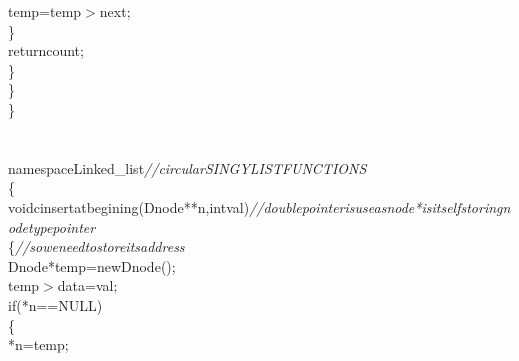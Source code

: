 \documentclass[a4paper, 9pt]{article}
\newcommand\SPC{\hspace*{0.6em}}
\newcommand\TAB{\hspace*{1.2em}}
\newcommand\HYP{\mbox{\char 45}}
\newcommand{\CppAComment}[1]{\textit{\textcolor[rgb]{0.4,0.45,0.48}{#1}}}
\newcommand{\CppAIdentifier}[1]{\textcolor[rgb]{0.88,0.89,0.89}{#1}}
\newcommand{\CppAReservedWord}[1]{\textcolor[rgb]{0.4,0.55,0.69}{#1}}
\newcommand{\CppASpace}[1]{\colorbox[rgb]{0.16,0.19,0.2}{#1}}
\newcommand{\CppASymbol}[1]{\textcolor[rgb]{0.91,0.89,0.72}{#1}}
\begin{document}
\begin{ttfamily}
\CppASpace{\TAB \TAB \TAB \TAB }\CppAIdentifier{temp}\CppASpace{\SPC }\CppASymbol{=}\CppASpace{\SPC }\CppAIdentifier{temp}\CppASymbol{\HYP $>$}\CppAIdentifier{next}\CppASymbol{;}\\
\CppASpace{\TAB \TAB \TAB }\CppASymbol{\}}\\
\CppASpace{\TAB \TAB }\CppAReservedWord{return}\CppASpace{\SPC }\CppAIdentifier{count}\CppASymbol{;}\\
\CppASpace{\TAB \TAB }\CppASymbol{\}}\\
\CppASpace{\TAB }\CppASymbol{\}}\\
\CppASymbol{\}}\\
\\
\\
\CppAReservedWord{namespace}\CppASpace{\SPC }\CppAIdentifier{Linked\_list}\CppASpace{\SPC \SPC }\CppAComment{//circularSINGYLISTFUNCTIONS}\\
\CppASymbol{\{}\\
\CppASpace{\TAB }\CppAReservedWord{void}\CppASpace{\SPC \SPC }\CppAIdentifier{cinsertatbegining}\CppASymbol{(}\CppASpace{\SPC }\CppAIdentifier{Dnode}\CppASymbol{*}\CppASymbol{*}\CppASpace{\SPC }\CppAIdentifier{n}\CppASymbol{,}\CppAReservedWord{int}\CppASpace{\SPC }\CppAIdentifier{val}\CppASymbol{)}\CppAComment{//double\SPC pointer\SPC is\SPC use\SPC as\SPC node\SPC *\SPC is\SPC itself\SPC storing\SPC node\SPC type\SPC pointer\SPC }\\
\CppASpace{\TAB }\CppASymbol{\{}\CppASpace{\SPC \SPC \SPC \SPC \SPC \SPC \SPC \SPC \SPC \SPC \SPC \SPC \SPC \SPC \SPC \SPC \SPC \SPC \SPC \SPC \SPC \SPC \SPC \SPC \SPC \SPC \SPC \SPC }\CppAComment{//\SPC so\SPC we\SPC need\SPC to\SPC store\SPC its\SPC address}\\
\CppASpace{\TAB \TAB }\CppAIdentifier{Dnode}\CppASymbol{*}\CppASpace{\SPC }\CppAIdentifier{temp}\CppASpace{\SPC }\CppASymbol{=}\CppAReservedWord{new}\CppASpace{\SPC }\CppAIdentifier{Dnode}\CppASymbol{(}\CppASymbol{)}\CppASymbol{;}\\
\CppASpace{\TAB \SPC \SPC \SPC \SPC \SPC }\CppAIdentifier{temp}\CppASymbol{\HYP $>$}\CppAIdentifier{data}\CppASymbol{=}\CppAIdentifier{val}\CppASymbol{;}\\
\CppASpace{\TAB \SPC \SPC \SPC \SPC }\CppAReservedWord{if}\CppASymbol{(}\CppASymbol{*}\CppAIdentifier{n}\CppASymbol{==}\CppAIdentifier{NULL}\CppASymbol{)}\\
\CppASpace{\TAB \SPC \SPC \SPC \SPC \TAB }\CppASymbol{\{}\CppASpace{\SPC }\\
\CppASpace{\TAB \TAB \TAB }\CppASymbol{*}\CppAIdentifier{n}\CppASymbol{=}\CppAIdentifier{temp}\CppASymbol{;}\\

\end{ttfamily}
\end{document}
